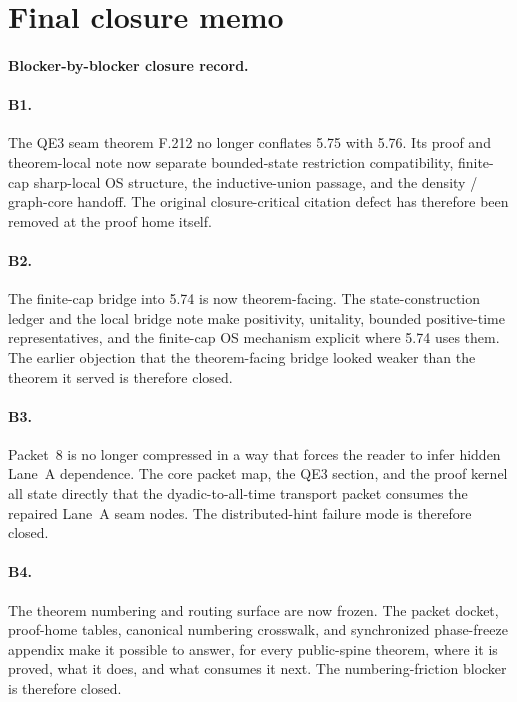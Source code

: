 \section{Final closure memo}\label{sec:p9-memo}

\paragraph{Blocker-by-blocker closure record.}

\paragraph{B1.}
The QE3 seam theorem F.212 no longer conflates 5.75 with 5.76. Its proof and theorem-local note now separate bounded-state restriction compatibility, finite-cap sharp-local OS structure, the inductive-union passage, and the density / graph-core handoff. The original closure-critical citation defect has therefore been removed at the proof home itself.

\paragraph{B2.}
The finite-cap bridge into 5.74 is now theorem-facing. The state-construction ledger and the local bridge note make positivity, unitality, bounded positive-time representatives, and the finite-cap OS mechanism explicit where 5.74 uses them. The earlier objection that the theorem-facing bridge looked weaker than the theorem it served is therefore closed.

\paragraph{B3.}
Packet~8 is no longer compressed in a way that forces the reader to infer hidden Lane~A dependence. The core packet map, the QE3 section, and the proof kernel all state directly that the dyadic-to-all-time transport packet consumes the repaired Lane~A seam nodes. The distributed-hint failure mode is therefore closed.

\paragraph{B4.}
The theorem numbering and routing surface are now frozen. The packet docket, proof-home tables, canonical numbering crosswalk, and synchronized phase-freeze appendix make it possible to answer, for every public-spine theorem, where it is proved, what it does, and what consumes it next. The numbering-friction blocker is therefore closed.

